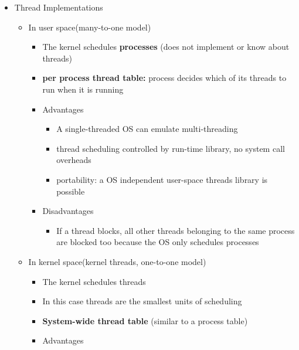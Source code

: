 \documentclass[11pt]{article}
\theoremstyle{definition}
\begin{document}
\begin{itemize}
\begin{itemize}
                \end{itemize}
                \item Thread Implementations
                    \begin{itemize}
                        \item In user space(many-to-one model)
                        \begin{itemize}
                            \item The kernel schedules \textbf{processes} (does not implement or know about threads)
                            \item \textbf{per process thread table:} process decides which of its threads to run when it is running
                            \item Advantages
                            \begin{itemize}
                                \item A single-threaded OS can emulate multi-threading
                                \item thread scheduling controlled by run-time library, no system call overheads
                                \item portability: a OS independent user-space threads library is possible
                            \end{itemize}
                            \item Disadvantages
                            \begin{itemize}
                                \item If a thread blocks, all other threads belonging to the same process are blocked too
                                because the OS only schedules processes
                            \end{itemize}
                        \end{itemize}
                        \item In kernel space(kernel threads, one-to-one model)
                        \begin{itemize}
                            \item The kernel schedules threads
                            \item In this case threads are the smallest units of scheduling
                            \item \textbf{System-wide thread table} (similar to a process table)
                            \item Advantages

\end{itemize}
\end{itemize}
\end{itemize}
\end{document}

